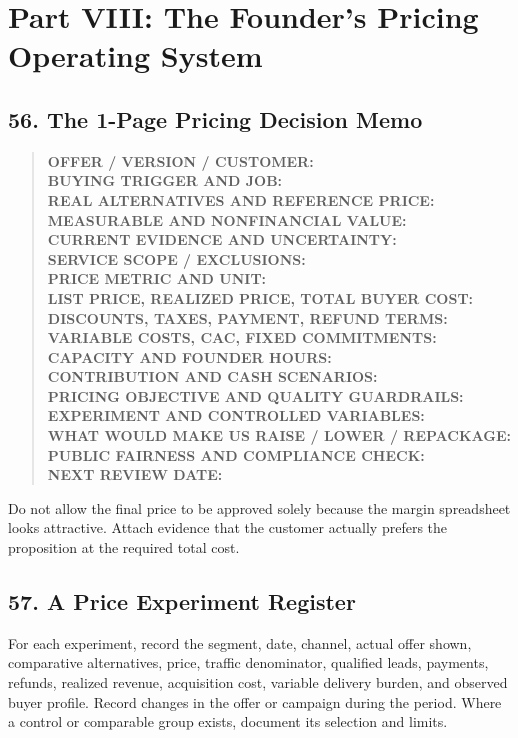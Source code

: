 \section*{Part VIII: The Founder's Pricing Operating System}

\subsection*{56. The 1-Page Pricing Decision Memo}

\begin{quote}
\small
\textbf{OFFER / VERSION / CUSTOMER:}\\
\textbf{BUYING TRIGGER AND JOB:}\\
\textbf{REAL ALTERNATIVES AND REFERENCE PRICE:}\\
\textbf{MEASURABLE AND NONFINANCIAL VALUE:}\\
\textbf{CURRENT EVIDENCE AND UNCERTAINTY:}\\
\textbf{SERVICE SCOPE / EXCLUSIONS:}\\
\textbf{PRICE METRIC AND UNIT:}\\
\textbf{LIST PRICE, REALIZED PRICE, TOTAL BUYER COST:}\\
\textbf{DISCOUNTS, TAXES, PAYMENT, REFUND TERMS:}\\
\textbf{VARIABLE COSTS, CAC, FIXED COMMITMENTS:}\\
\textbf{CAPACITY AND FOUNDER HOURS:}\\
\textbf{CONTRIBUTION AND CASH SCENARIOS:}\\
\textbf{PRICING OBJECTIVE AND QUALITY GUARDRAILS:}\\
\textbf{EXPERIMENT AND CONTROLLED VARIABLES:}\\
\textbf{WHAT WOULD MAKE US RAISE / LOWER / REPACKAGE:}\\
\textbf{PUBLIC FAIRNESS AND COMPLIANCE CHECK:}\\
\textbf{NEXT REVIEW DATE:}
\end{quote}

Do not allow the final price to be approved solely because the margin spreadsheet looks attractive. Attach evidence that the customer actually prefers the proposition at the required total cost.

\subsection*{57. A Price Experiment Register}

For each experiment, record the segment, date, channel, actual offer shown, comparative alternatives, price, traffic denominator, qualified leads, payments, refunds, realized revenue, acquisition cost, variable delivery burden, and observed buyer profile. Record changes in the offer or campaign during the period. Where a control or comparable group exists, document its selection and limits.

